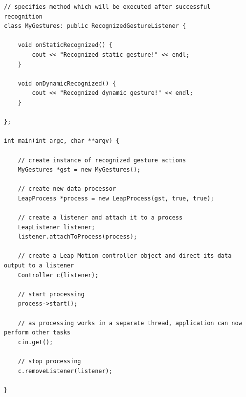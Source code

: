 \begin{lstlisting}
// specifies method which will be executed after successful recognition
class MyGestures: public RecognizedGestureListener {

	void onStaticRecognized() {
		cout << "Recognized static gesture!" << endl;
	}

	void onDynamicRecognized() {
		cout << "Recognized dynamic gesture!" << endl;
	}

};

int main(int argc, char **argv) {

	// create instance of recognized gesture actions
	MyGestures *gst = new MyGestures();

	// create new data processor
	LeapProcess *process = new LeapProcess(gst, true, true);

	// create a listener and attach it to a process
	LeapListener listener;
	listener.attachToProcess(process);
	
	// create a Leap Motion controller object and direct its data output to a listener
	Controller c(listener);

	// start processing
	process->start();
	
	// as processing works in a separate thread, application can now perform other tasks
	cin.get();
	
	// stop processing
	c.removeListener(listener);

}
\end{lstlisting}